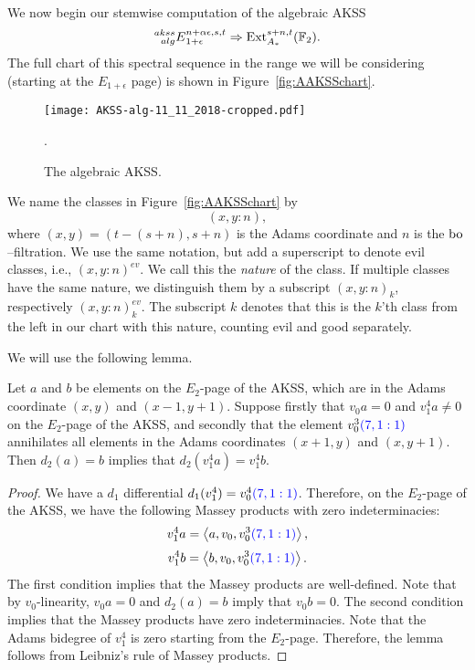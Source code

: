 We now begin our stemwise computation of the algebraic AKSS
$$ \prescript{akss}{alg}{E}_{1+\epsilon}^{n+\alpha\epsilon, s,t} \Rightarrow \operatorname{Ext}^{s+n,t}_{A_*}(\mathbb{F}_2). $$
The full chart of this spectral sequence in the range we will be considering (starting at the $E_{1+\epsilon}$ page) is shown in Figure~\ref{fig:AAKSSchart}.  

\begin{figure}
\texttt{[image: AKSS-alg-11\_11\_2018-cropped.pdf]}
\caption{The algebraic AKSS. 
}\label{fig:AAKSSchart}\label{fig:HCchart}.
\end{figure}


\begin{not*}We name the classes in Figure~\ref{fig:AAKSSchart} by
\[(x,y: n),\]
where $(x,y)=(t-(s+n),s+n)$ is the Adams coordinate and $n$ is the $\mathrm{bo}$--filtration. We use the same notation, but add a superscript to denote evil classes, i.e., $(x,y: n)^{ev}$. We call this the \emph{nature} of the class.
If multiple classes have the same nature, we distinguish them by a subscript $(x,y: n)_k$, respectively $(x,y: n)_k^{ev}$. The subscript $k$ denotes that this is the $k$'th class from the left in our chart with this nature, counting evil and good separately. %
\end{not*}


We will use the following lemma.
\begin{lem}\label{lem:v14}
Let $a$ and $b$ be elements on the $E_2$-page of the AKSS, which are in the Adams coordinate $(x, y)$ and $(x-1, y+1)$. Suppose firstly that $v_0  a =0$ and $v_1^4 a \neq 0$ on the $E_2$-page of the AKSS, and secondly that the element $v_0^3 {\color{blue}(7,1:1)}$ annihilates all elements in the Adams coordinates $(x+1, y)$ and $(x, y+1)$. Then $d_2(a) = b$ implies that $d_2(v_1^4  a) = v_1^4  b$.
\end{lem}
\begin{proof}
We have a $d_1$ differential $d_1(v_1^4) = v_0^4 {\color{blue}(7,1:1)}$. Therefore, on the $E_2$-page of the AKSS, we have the following Massey products with zero indeterminacies:
\[v_1^4 a = \left<a, v_0, v_0^3{\color{blue}(7,1:1)}\right>,\]
\[v_1^4 b = \left<b, v_0, v_0^3{\color{blue}(7,1:1)}\right>.\]
The first condition implies that the Massey products are well-defined. Note that by $v_0$-linearity, $v_0  a =0$ and $d_2(a) = b$ imply that $v_0  b = 0$. The second condition implies that the Massey products have zero indeterminacies. Note that the Adams bidegree of $v_1^4$ is zero starting from the $E_2$-page. Therefore, the lemma follows from Leibniz's rule of Massey products.
\end{proof}


